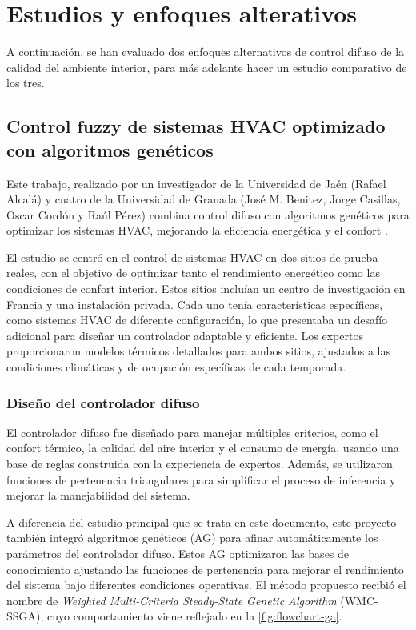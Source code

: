 \section{Estudios y enfoques alterativos}

A continuación, se han evaluado dos enfoques alternativos de control difuso de la calidad del ambiente interior, para más adelante hacer un estudio comparativo de los tres.

\subsection{Control fuzzy de sistemas HVAC optimizado con algoritmos genéticos}

Este trabajo, realizado por un investigador de la Universidad de Jaén (Rafael Alcalá) y cuatro de la Universidad de Granada (José M. Benitez, Jorge Casillas, Oscar Cordón y Raúl Pérez) combina control difuso con algoritmos genéticos para optimizar los sistemas HVAC, mejorando la eficiencia energética y el confort \parencite{alcala2003fuzzy}.

El estudio se centró en el control de sistemas HVAC en dos sitios de prueba reales, con el objetivo de optimizar tanto el rendimiento energético como las condiciones de confort interior. Estos sitios incluían un centro de investigación en Francia y una instalación privada. Cada uno tenía características específicas, como sistemas HVAC de diferente configuración, lo que presentaba un desafío adicional para diseñar un controlador adaptable y eficiente. Los expertos proporcionaron modelos térmicos detallados para ambos sitios, ajustados a las condiciones climáticas y de ocupación específicas de cada temporada.

\subsubsection{Diseño del controlador difuso}

El controlador difuso fue diseñado para manejar múltiples criterios, como el confort térmico, la calidad del aire interior y el consumo de energía, usando una base de reglas construida con la experiencia de expertos. Además, se utilizaron funciones de pertenencia triangulares para simplificar el proceso de inferencia y mejorar la manejabilidad del sistema.

A diferencia del estudio principal que se trata en este documento, este proyecto también integró algoritmos genéticos (AG) para afinar automáticamente los parámetros del controlador difuso. Estos AG optimizaron las bases de conocimiento ajustando las funciones de pertenencia para mejorar el rendimiento del sistema bajo diferentes condiciones operativas. El método propuesto recibió el nombre de \textit{Weighted Multi-Criteria Steady-State Genetic Algorithm} (WMC-SSGA), cuyo comportamiento viene reflejado en la \autoref{fig:flowchart-ga}.

